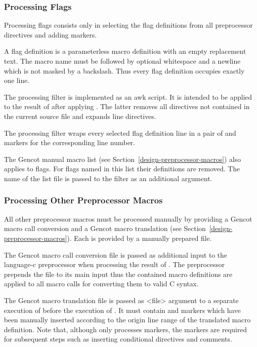 \subsubsection{Processing Flags}

Processing flags consists only in selecting the flag definitions from all preprocessor directives and adding
 markers.

A flag definition is a parameterless macro definition with an empty replacement text. The macro name must 
be followed by optional whitespace and a newline which is not masked by a backslash. Thus every flag definition
occupies exactly one line.

The processing filter  is implemented as an awk script. It is intended to be applied 
to the result
of  after applying . The latter removes all directives not contained
in the current source file and expands line directives. 

The processing filter wraps every selected flag definition line in a pair of  and  
markers for the corresponding line number.

The Gencot
manual macro list (see Section~\ref{design-preprocessor-macros})
also applies to flags. For flags named in this list their definitions are removed. The name of the list file is 
passed to the filter  as an additional argument.

\subsubsection{Processing Other Preprocessor Macros}

All other preprocessor macros must be processed manually by providing a Gencot macro call conversion and a
Gencot macro translation (see Section~\ref{design-preprocessor-macros}). Each is provided by a manually
prepared file.

The Gencot macro call conversion file is passed as additional input to the language-c preprocessor when
processing the result of . The preprocessor prepends the file to its main input thus 
the contained macro definitions are applied to all macro calls for converting them to valid C syntax.

The Gencot macro translation file is passed as <file> argument to a separate execution of 
before the execution of . It must contain  and 
markers which have been manually inserted according to the origin line range of the translated macro
definition. Note that, although  only processes  markers, the 
markers are required for subsequent steps such as inserting conditional directives and comments.

